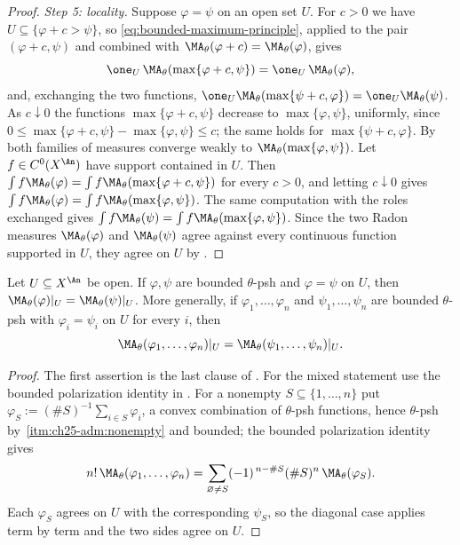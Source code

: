 \begin{proof}
\emph{Step 5: locality.}  Suppose $\varphi=\psi$ on an open set $U$.  For
$c>0$ we have $U\subseteq\{\varphi+c>\psi\}$, so
\eqref{eq:bounded-maximum-principle}, applied to the pair
$(\varphi+c,\psi)$ and combined with
$\MA_\theta(\varphi+c)=\MA_\theta(\varphi)$, gives
\[
 \one_{U}\,\MA_\theta(\max\{\varphi+c,\psi\})
 =\one_{U}\,\MA_\theta(\varphi) ,
\]
and, exchanging the two functions,
$\one_U\MA_\theta(\max\{\psi+c,\varphi\})=\one_U\MA_\theta(\psi)$.  As
$c\downarrow0$ the functions $\max\{\varphi+c,\psi\}$ decrease to
$\max\{\varphi,\psi\}$, uniformly, since
$0\leq\max\{\varphi+c,\psi\}-\max\{\varphi,\psi\}\leq c$; the same holds
for $\max\{\psi+c,\varphi\}$.  By  both
families of measures converge weakly to
$\MA_\theta(\max\{\varphi,\psi\})$.  Let $f\in C^0(X^{\An})$ have support
contained in $U$.  Then $\int f\MA_\theta(\varphi)
=\int f\MA_\theta(\max\{\varphi+c,\psi\})$ for every $c>0$, and letting
$c\downarrow0$ gives $\int f\MA_\theta(\varphi)
=\int f\MA_\theta(\max\{\varphi,\psi\})$.  The same computation with the
roles exchanged gives $\int f\MA_\theta(\psi)
=\int f\MA_\theta(\max\{\varphi,\psi\})$.  Since the two Radon measures
$\MA_\theta(\varphi)$ and $\MA_\theta(\psi)$ agree against every
continuous function supported in $U$, they agree on $U$ by
.
\end{proof}

\begin{corollary}
\label{cor:ch25-locality}
Let $U\subseteq X^{\An}$ be open.  If $\varphi,\psi$ are bounded
$\theta$-psh and $\varphi=\psi$ on $U$, then
$\MA_\theta(\varphi)|_U=\MA_\theta(\psi)|_U$.  More generally, if
$\varphi_1,\ldots,\varphi_n$ and $\psi_1,\ldots,\psi_n$ are bounded
$\theta$-psh with $\varphi_i=\psi_i$ on $U$ for every $i$, then
\[
 \MA_\theta(\varphi_1,\ldots,\varphi_n)|_U
 =\MA_\theta(\psi_1,\ldots,\psi_n)|_U .
\]
\end{corollary}

\begin{proof}
The first assertion is the last clause of
.  For the mixed statement use the
bounded polarization identity in .
For a nonempty $S\subseteq\{1,\ldots,n\}$ put
$\varphi_S:=(\#S)^{-1}\sum_{i\in S}\varphi_i$, a convex combination of
$\theta$-psh functions, hence $\theta$-psh by
\,\cref{itm:ch25-adm:nonempty} and bounded;
the bounded polarization identity gives
\[
 n!\,\MA_\theta(\varphi_1,\ldots,\varphi_n)
 =\sum_{\varnothing\neq S}(-1)^{\,n-\#S}(\#S)^n\,
    \MA_\theta(\varphi_S).
\]
Each $\varphi_S$ agrees on $U$ with the corresponding $\psi_S$, so the
diagonal case applies term by term and the two sides agree on $U$.
\end{proof}

